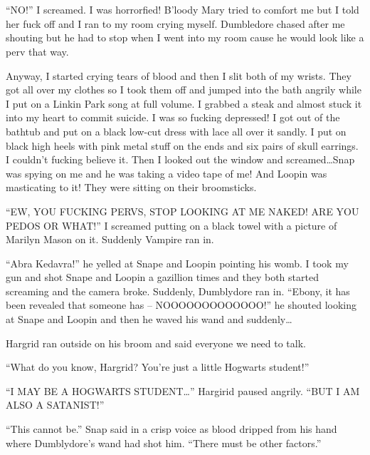 \section{}



\enquote{NO\@!} I screamed. I was horrorfied! B'loody Mary tried to comfort me but I told her fuck off and I ran to my room crying myself. Dumbledore chased after me shouting but he had to stop when I went into my room cause he would look like a perv that way.

Anyway, I started crying tears of blood and then I slit both of my wrists. They got all over my clothes so I took them off and jumped into the bath angrily while I put on a Linkin Park song at full volume. I grabbed a steak and almost stuck it into my heart to commit suicide. I was so fucking depressed! I got out of the bathtub and put on a black low-cut dress with lace all over it sandly. I put on black high heels with pink metal stuff on the ends and six pairs of skull earrings. I couldn't fucking believe it. Then I looked out the window and screamed\ldots Snap was spying on me and he was taking a video tape of me! And Loopin was masticating to it! They were sitting on their broomsticks.

\enquote{EW, YOU FUCKING PERVS, STOP LOOKING AT ME NAKED! ARE YOU PEDOS OR WHAT\@!} I screamed putting on a black towel with a picture of Marilyn Mason on it. Suddenly Vampire ran in.

\enquote{Abra Kedavra!} he yelled at Snape and Loopin pointing his womb. I took my gun and shot Snape and Loopin a gazillion times and they both started screaming and the camera broke. Suddenly, Dumblydore ran in. \enquote{Ebony, it has been revealed that someone has -- NOOOOOOOOOOOOO\@!} he shouted looking at Snape and Loopin and then he waved his wand and suddenly\ldots

Hargrid ran outside on his broom and said everyone we need to talk.

\enquote{What do you know, Hargrid? You're just a little Hogwarts student!}

\enquote{I MAY BE A HOGWARTS STUDENT\ldots} Hargirid paused angrily. \enquote{BUT I AM ALSO A SATANIST\@!}

\enquote{This cannot be.} Snap said in a crisp voice as blood dripped from his hand where Dumblydore's wand had shot him. \enquote{There must be other factors.}

